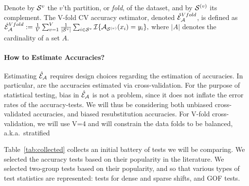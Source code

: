 \documentclass[oupdraft]{bio}
\begin{document}
\begin{definition}
	\label{def:v-fold}
	Denote by $\mathcal{S}^{v}$ the $v$'th partition, or \emph{fold}, of the dataset, and by $\mathcal{S}^{(v)}$ its complement.
	The V-fold CV accuracy estimator, denoted $\hat{\mathcal{E}}_{\mathcal{A}}^{Vfold}$, is defined as 	
	$\hat{\mathcal{E}}_{\mathcal{A}}^{Vfold} := 
	\frac 1V \sum_{v=1}^{V} \frac{1}{|\mathcal{S}^v|} \sum_{i \in \mathcal{S}^{v}} \mathcal{I}{\{ \mathcal{A}_{\mathcal{S}^{(v)}}(x_i)=y_i \}},$
	where $|A|$ denotes the cardinality of a set $A$.
\end{definition}




\paragraph{How to Estimate Accuracies?}

Estimating $\hat{\mathcal{E}}_{\mathcal{A}}$ requires design choices regarding the estimation of accuracies. 
In particular, are the accuracies estimated via cross-validation. 
For the purpose of statistical testing, bias in $\hat{\mathcal{E}}_{\mathcal{A}}$ is not a problem, since  it does not inflate the error rates of the accuracy-tests. We will thus be considering both unbiased cross-validated accuracies, and biased resubstitution accuracies.
For V-fold cross-validation, we will use V=4 and will constrain the data folds to be  balanced, a.k.a.\ stratified



\bigskip

Table~\ref{tab:collected} collects an initial battery of tests we will be comparing. 
We selected the accuracy tests based on their popularity in the literature.
We selected two-group tests based on their popularity, and so that various types of test statistics are represented: tests for dense and sparse shifts, and GOF tests. 
\end{document}
